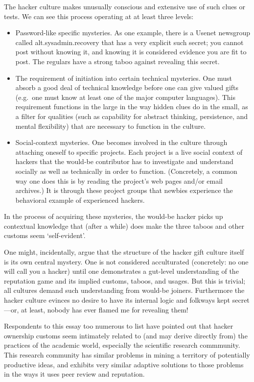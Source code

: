 The hacker culture makes unusually conscious and extensive use of such clues or
tests.  We can see this process operating at at least three levels:
\begin{itemize}
\item Password-like specific mysteries.  As one example, there is a Usenet
  newsgroup called alt.sysadmin.recovery that has a very explicit such secret;
  you cannot post without knowing it, and knowing it is considered evidence you
  are fit to post.  The regulars have a strong taboo against revealing this
  secret.
\item The requirement of initiation into certain technical mysteries.  One must
  absorb a good deal of technical knowledge before one can give valued gifts
  (e.g.\ one must know at least one of the major computer languages).  This
  requirement functions in the large in the way hidden clues do in the small, as
  a filter for qualities (such as capability for abstract thinking, persistence,
  and mental flexibility) that are necessary to function in the culture.
\item Social-context mysteries.  One becomes involved in the culture through
  attaching oneself to specific projects.  Each project is a live social context
  of hackers that the would-be contributor has to investigate and understand
  socially as well as technically in order to function.  (Concretely, a common
  way one does this is by reading the project's web pages and/or email
  archives.) It is through these project groups that newbies experience the
  behavioral example of experienced hackers.
\end{itemize}

In the process of acquiring these mysteries, the would-be hacker picks up
contextual knowledge that (after a while) does make the three taboos and other
customs seem `self-evident'.

One might, incidentally, argue that the structure of the hacker gift culture
itself is its own central mystery.  One is not considered acculturated
(concretely: no one will call you a hacker) until one demonstrates a gut-level
understanding of the reputation game and its implied customs, taboos, and
usages.  But this is trivial; all cultures demand such understanding from
would-be joiners.  Furthermore the hacker culture evinces no desire to have its
internal logic and folkways kept secret—or, at least, nobody has ever flamed me
for revealing them!

Respondents to this essay too numerous to list have pointed out that hacker
ownership customs seem intimately related to (and may derive directly from) the
practices of the academic world, especially the scientific research commmunity.
This research community has similar problems in mining a territory of
potentially productive ideas, and exhibits very similar adaptive solutions to
those problems in the ways it uses peer review and reputation.

